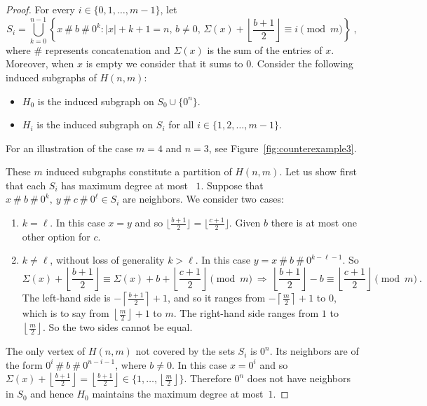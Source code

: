 \documentclass[a4paper,10pt]{amsart}
\begin{document}
\begin{proof}
    For every $i\in\{0,1,\dots,m-1\}$, let
\[
 S_i = \bigcup_{k=0}^{n-1} \left\{ x  \ \#\ b \ \#\ 0^k : |x| + k + 1 = n,\, b \neq 0,\, \Sigma(x) + \left\lfloor \frac{b+1}{2} \right\rfloor \equiv i \pmod{m} \right\}\ ,
\]
where $\#$ represents concatenation and $\Sigma(x)$ is the sum of the entries of $x$. Moreover, when $x$ is empty  we consider that it sums to $0$. Consider the following induced subgraphs of $H(n,m)$:
    \begin{itemize}
        \item $H_0$ is the induced subgraph on $S_0\cup\{0^n\}$.
        \item $H_i$ is the induced subgraph on $S_i$ for all $i\in\{1,2,\dots,m-1\}.$
    \end{itemize}

For an illustration of the case 
 $m=4$ and $n=3$,
see Figure~\ref{fig:counterexample3}.

    
    These $m$ induced subgraphs constitute a partition of $H(n,m)$. 
Let us show first that each $S_i$ has maximum degree at most ~$1$. Suppose that $x\ \#\ b\ \#\ 0^k,\ y\ \#\ c\ \#\ 0^\ell \in S_i$ are neighbors. We consider two cases:
\begin{enumerate}
    \item $k = \ell$. In this case $x = y$ and so $\lfloor \frac{b+1}{2} \rfloor = \lfloor \frac{c+1}{2} \rfloor$. Given $b$ there is at most one other option for $c$.
    \item $k \neq \ell$, without loss of generality $k > \ell$. In this case $y= x \ \#\ b \ \#\ 0^{k-\ell-1}$. So
    \[
     \Sigma(x) + \left\lfloor \frac{b+1}{2} \right\rfloor \equiv \Sigma(x) + b + \left\lfloor \frac{c+1}{2} \right\rfloor \pmod{m} \ \Rightarrow\ 
     \left\lfloor \frac{b+1}{2} \right\rfloor - b \equiv \left\lfloor \frac{c+1}{2} \right\rfloor \pmod{m}\ .
    \]
    The left-hand side is $-\left\lceil \frac{b+1}{2} \right\rceil+1$, and so it ranges from $-\left\lceil \frac{m}{2}\right\rceil +1$ to $0$, which is to say from $\left\lfloor \frac{m}{2} \right\rfloor + 1$ to $m$.
    The right-hand side ranges from $1$ to $\left\lfloor\frac{m}{2} \right\rfloor$.
    So the two sides cannot be equal.
\end{enumerate}
The only vertex of $H(n,m)$ not covered by the sets $S_i$ is $0^n$. Its neighbors are of the form $0^i \ \#\ b \ \#\ 0^{n-i-1}$, where $b \neq 0$. In this case $x = 0^i$ and so $\Sigma(x) + \left\lfloor \frac{b+1}{2} \right\rfloor = \left\lfloor \frac{b+1}{2} \right\rfloor \in \{1, \ldots, \left\lfloor \frac{m}{2} \right\rfloor\}$. Therefore $0^n$ does not have neighbors in $S_0$ and hence $H_0$ maintains the maximum degree at most~$1$.


\end{proof}
\end{document}
